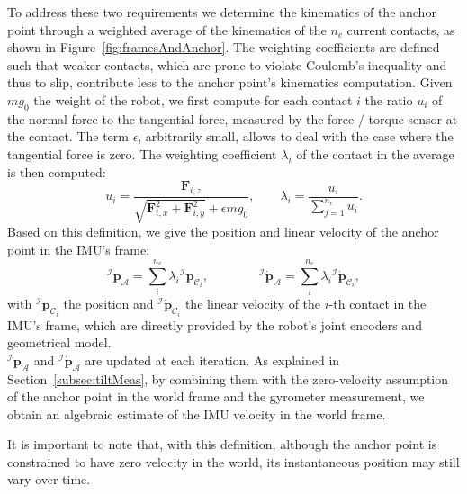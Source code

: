 \documentclass{IJCAS}
\begin{document}
To address these two requirements we determine the kinematics of the anchor point through a weighted average of the kinematics of the $n_{c}$ current contacts, as shown in Figure~\ref{fig:framesAndAnchor}.  
The weighting coefficients are defined such that weaker contacts, which are prone to violate Coulomb's inequality and thus to slip, contribute less to the anchor point's kinematics computation. Given $mg_{0}$ the weight of the robot, we first compute for each contact $i$ the ratio $u_{i}$ of the normal force to the tangential force, measured by the force / torque sensor at the contact. The term $\epsilon$, arbitrarily small, allows to deal with the case where the tangential force is zero. The weighting coefficient $\lambda_{i}$ of the contact in the average is then computed:
\begin{equation}
    u_{i} = \frac{\boldsymbol{F}_{i,z}}{\sqrt{\boldsymbol{F}_{i,x}^2 + \boldsymbol{F}_{i,y}^2} + \epsilon mg_{0}}, \qquad \lambda_{i}=\frac{u_{i}}{\sum^{n_{c}}_{j=1}u_{i}}. \label{eq:ratio_ui}
\end{equation}
Based on this definition, we give the position and linear velocity of the anchor point in the IMU's frame:
\begin{equation} 
{^{\mathcal{I}}}\boldsymbol{p}_{\mathcal{A}} = \sum^{n_{c}}_{i} \lambda_{i}  {^{\mathcal{I}}} \boldsymbol{p}_{{\mathcal{C}}_{i}} , \qquad \qquad {^{\mathcal{I}}} \dot{\boldsymbol{p}}_{\mathcal{A}} = \sum^{n_{c}}_{i} \lambda_{i}  {^{\mathcal{I}}} \dot{\boldsymbol{p}}_{{\mathcal{C}}_{i}}, \label{eq:imuAnchorKine} 
\end{equation} 
with ${^{\mathcal{I}}} \boldsymbol{p}_{{\mathcal{C}}_{i}}$ the position and ${^{\mathcal{I}}} \dot{\boldsymbol{p}}_{{\mathcal{C}}_{i}}$ the linear velocity of the $i$-th contact in the IMU's frame, which are directly provided by the robot's joint encoders and geometrical model. \\${^{\mathcal{I}}}\boldsymbol{p}_{\mathcal{A}}$ and ${^{\mathcal{I}}} \dot{\boldsymbol{p}}_{\mathcal{A}}$ are updated at each iteration. As explained in Section~\ref{subsec:tiltMeas}, by combining them with the zero-velocity assumption of the anchor point in the world frame and the gyrometer measurement, we obtain an algebraic estimate of the IMU velocity in the world frame.

It is important to note that, with this definition, although the anchor point is constrained to have zero velocity in the world, its instantaneous position may still vary over time.
\end{document}
